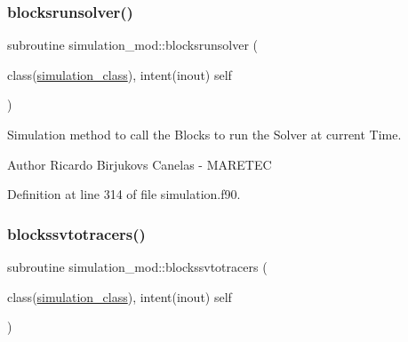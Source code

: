 \subsubsection{\texorpdfstring{blocksrunsolver()}{blocksrunsolver()}}
{\footnotesize\ttfamily subroutine simulation\+\_\+mod\+::blocksrunsolver (\begin{DoxyParamCaption}\item[{class(\mbox{\hyperlink{structsimulation__mod_1_1simulation__class}{simulation\+\_\+class}}), intent(inout)}]{self }\end{DoxyParamCaption})\hspace{0.3cm}{\ttfamily [private]}}



Simulation method to call the Blocks to run the Solver at current Time. 

\begin{DoxyAuthor}{Author}
Ricardo Birjukovs Canelas -\/ M\+A\+R\+E\+T\+EC 
\end{DoxyAuthor}


Definition at line 314 of file simulation.\+f90.


\mbox{\label{namespacesimulation__mod_a5eeea0cb6e0e94c5fd0336a13d635866}} 
\subsubsection{\texorpdfstring{blockssvtotracers()}{blockssvtotracers()}}
{\footnotesize\ttfamily subroutine simulation\+\_\+mod\+::blockssvtotracers (\begin{DoxyParamCaption}\item[{class(\mbox{\hyperlink{structsimulation__mod_1_1simulation__class}{simulation\+\_\+class}}), intent(inout)}]{self }\end{DoxyParamCaption})\hspace{0.3cm}{\ttfamily [private]}}



